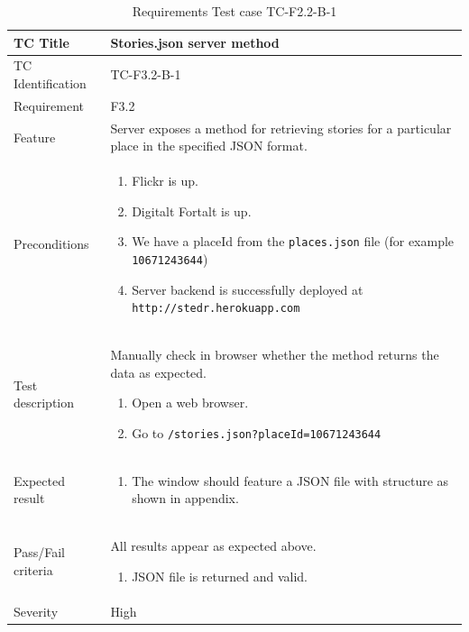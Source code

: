 \documentclass[11pt]{book}
\begin{document}
\begin{table}
  \begin{tabular}{| p{3cm} | p{9.5cm} |} \hline 
    TC Title              & Stories.json server method \\ \hline 
    TC Identification     & TC-F3.2-B-1 \\ \hline 
    Requirement           & F3.2 \\ \hline 
    Feature               & Server exposes a method for retrieving stories for a particular place in the specified JSON format. \\ \hline 
    Preconditions         & \begin{enumerate}
                              \item Flickr is up.
                              \item Digitalt Fortalt is up.
                              \item We have a placeId from the \texttt{places.json} file (for example \texttt{10671243644})
                              \item Server backend is successfully deployed at \texttt{http://stedr.herokuapp.com}
                            \end{enumerate} \\ \hline 

    Test description      & Manually check in browser whether the method returns the data as expected.

                            \begin{enumerate}
                              \item Open a web browser.
                              \item Go to \texttt{/stories.json?placeId=10671243644}
                            \end{enumerate} \\ \hline 
    Expected result       & \begin{enumerate}
                              \item The window should feature a JSON file with structure as shown in appendix. %
                            \end{enumerate} \\ \hline 
    Pass/Fail criteria    & All results appear as expected above.
                            \begin{enumerate}
                              \item JSON file is returned and valid.
                            \end{enumerate} \\ \hline 
    Severity              & High \\ \hline 
  \end{tabular}
  \caption{Requirements Test case TC-F2.2-B-1}
  \label{tab:TCF3.2B1}
\end{table}
\end{document}
